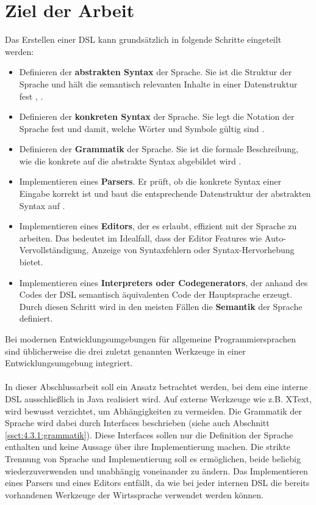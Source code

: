 \section{Ziel der Arbeit}\label{sct:2.4:ziel}
Das Erstellen einer DSL kann grundsätzlich in folgende Schritte eingeteilt werden:
\begin{itemize}
	\item Definieren der \textbf{abstrakten Syntax} der Sprache. Sie ist die Struktur der Sprache und hält die semantisch relevanten Inhalte in einer Datenstruktur fest \cite{www:heise}, \cite{vl:drachen:teil3}.
	\item Definieren der \textbf{konkreten Syntax} der Sprache. Sie legt die Notation der Sprache fest und damit, welche Wörter und Symbole gültig sind \cite{vl:drachen:teil3}.
	\item Definieren der \textbf{Grammatik} der Sprache. Sie ist die formale Beschreibung, wie die konkrete auf die abstrakte Syntax abgebildet wird \cite{www:heise}.
	\item Implementieren eines \textbf{Parsers}. Er prüft, ob die konkrete Syntax einer Eingabe korrekt ist und baut die entsprechende Datenstruktur der abstrakten Syntax auf \cite{vl:drachen:teil3}.
	\item Implementieren eines \textbf{Editors}, der es erlaubt, effizient mit der Sprache zu arbeiten. Das bedeutet im Idealfall, dass der Editor Features wie Auto-Vervollständigung, Anzeige von Syntaxfehlern oder Syntax-Hervorhebung bietet.
	\item Implementieren eines \textbf{Interpreters oder Codegenerators}, der anhand des Codes der DSL semantisch äquivalenten Code der Hauptsprache erzeugt. Durch diesen Schritt wird in den meisten Fällen die \textbf{Semantik} der Sprache definiert.
\end{itemize}
Bei modernen Entwicklungsumgebungen für allgemeine Programmiersprachen sind üblicherweise die drei zuletzt genannten Werkzeuge in einer Entwicklungsumgebung integriert.
\\ \\ %
In dieser Abschlussarbeit soll ein Ansatz betrachtet werden, bei dem eine interne DSL ausschließlich in Java realisiert wird. Auf externe Werkzeuge wie z.B. XText, wird bewusst verzichtet, um Abhängigkeiten zu vermeiden. Die Grammatik der Sprache wird dabei durch Interfaces beschrieben (siehe auch Abschnitt \ref{ssct:4.3.1:grammatik}). Diese Interfaces sollen nur die Definition der Sprache enthalten und keine Aussage über ihre Implementierung machen. Die strikte Trennung von Sprache und Implementierung soll es ermöglichen, beide beliebig wiederzuverwenden und unabhängig voneinander zu ändern.
Das Implementieren eines Parsers und eines Editors entfällt, da wie bei jeder internen DSL die bereits vorhandenen Werkzeuge der Wirtssprache verwendet werden können.

